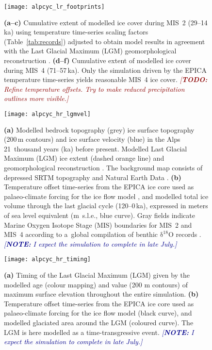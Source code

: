\documentclass{article}
\newcommand{\note}[1]{\textcolor{darkblue}{\emph{[\textbf{NOTE:} #1]}}}
\newcommand{\todo}[1]{\textcolor{darkred}{\emph{[\textbf{TODO:} #1]}}}
\newcommand{\chem}[1]{\ensuremath{\mathrm{#1}}}
\begin{document}
    \begin{figure}
      \centerline{\texttt{[image: alpcyc\_lr\_footprints]}}
      \caption{%
        \textbf{(a--c)} Cumulative extent of modelled ice cover during MIS~2
        (29--14\,ka) using temperature time-series scaling factors
        (Table~\ref{tab:records}) adjusted to obtain model results in agreement
        with the Last Glacial Maximum (LGM) geomorphological reconstruction
        \citep[solid red line,][]{Ehlers.etal.2011}.
        \textbf{(d--f)} Cumulative extent of modelled ice cover during MIS~4
        (71--57\,ka). Only the simulation driven by the EPICA temperature
        time-series yields reasonable MIS~4 ice cover.
        \todo{Refine temperature offsets. Try to make reduced precipitation
              outlines more visible.}}
      \label{fig:footprints}
    \end{figure}

    \begin{figure}
      \centerline{\texttt{[image: alpcyc\_hr\_lgmvel]}}
      \caption{%
        \textbf{(a)} Modelled bedrock topography (grey) ice surface topography
        (200\,m contours) and ice surface velocity (blue) in the Alps
        21~thousand years (ka) before present. Modelled Last Glacial Maximum
        (LGM) ice extent (dashed orange line) and geomorphological
        reconstruction \citep[solid red line,][]{Ehlers.etal.2011}. The
        background map consists of depressed SRTM \citep{Jarvis.etal.2008}
        topography and Natural Earth Data \citep{Patterson.Kelso.2017}.
        \textbf{(b)} Temperature offset time-series from the EPICA ice core
        used as palaeo-climate forcing for the ice flow model \citep[black
        curve,][]{Jouzel.etal.2007}, and modelled total ice volume through the
        last glacial cycle (120--0\,ka), expressed in meters of sea level
        equivalent (m~s.l.e., blue curve). Gray fields indicate Marine
        Oxygen Isotope Stage (MIS) boundaries for MIS~2 and MIS~4 according to
        a~global compilation of benthic \chem{\delta^{18}O} records
        \citep{Lisiecki.Raymo.2005}.
        \note{I expect the simulation to complete in late July.}}
      \label{fig:lgmvel}
    \end{figure}

    \begin{figure}
      \centerline{\texttt{[image: alpcyc\_hr\_timing]}}
      \caption{%
        \textbf{(a)} Timing of the Last Glacial Maximum (LGM) given by the
        modelled age (colour mapping) and value (200 m contours) of maximum
        surface elevation throughout the entire simulation.
        \textbf{(b)} Temperature offset time-series from the EPICA ice core
        used as palaeo-climate forcing for the ice flow model (black curve),
        and modelled glaciated area around the LGM (coloured curve). The LGM
        is here modelled as a time-transgressive event.
        \note{I expect the simulation to complete in late July.}}
      \label{fig:timing}
    \end{figure}
\end{document}
